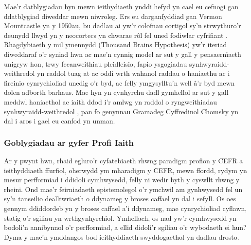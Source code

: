 Mae'r datblygiadau hyn mewn ieithydiaeth ynddi hefyd yn cael eu cefnogi gan ddatblygiad diweddar mewn niwroleg. Ers eu darganfyddiad gan Vermon Mountcastle yn y 1950au, bu dadlau ai yw'r colofnau cortigol sy'n strwythuro'r deunydd llwyd yn y neocortecs yn chwarae rôl fel uned fodiwlar cyfrifiant \parencite{horton_cortical_2005}. Rhagdybiaeth y mil ymennydd (Thousand Brains Hypothesis) \parencite{hawkins_theory_2017, hawkins_thousand_2021} yw'r iteriad diweddaraf o'r syniad hwn ac mae'n cynnig model ar sut y gall y pensaernïaeth unigryw hon, trwy fecanweithiau pleidleisio, fapio ysgogiadau synhwyraidd-weithredol yn raddol tuag at ac oddi wrth wahanol raddau o haniaethu ac i fireinio cynrychioliad unedig o'r byd, ac felly ymgysylltu'n well â'r byd mewn dolen adborth barhaus. Mae hyn yn cynhyrchu dadl gymhellol ar sut y gall meddwl haniaethol ac iaith ddod i'r amlwg yn raddol o ryngweithiadau synhwyraidd-weithredol \parencite{constantinescu_organizing_2016}, pan fo genynnau Gramadeg Cyffredinol Chomsky yn dal i aros i gael eu canfod yn unman.

\subsubsection{Goblygiadau ar gyfer Profi Iaith}
Ar y pwynt hwn, rhaid egluro'r cyfatebiaeth rhwng paradigm profion y CEFR a ieithyddiaeth ffurfiol, oherwydd ym mharadigm y CEFR, mewn ffordd, rydym yn mesur perfformiad i ddidoli cymhwysedd, felly ni wedir byth y cyswllt rhwng y rheini. Ond mae'r feirniadaeth epistemolegol o'r ymchwil am gynhwysedd fel un sy'n tanseilio dealltwriaeth o ddynameg y broses caffael yn dal i sefyll. Os oes gennym ddiddordeb yn y broses caffael a'i ddynameg, mae cynrychioliad cyflawn, statig o'r sgiliau yn wrthgynhyrchiol. Ymhellach, os nad yw'r cymhwysedd yn bodoli'n annibynnol o'r perfformiad, a ellid didoli'r sgiliau o'r wybodaeth ei hun? Dyma y mae'n ymddangos bod ieithyddiaeth swyddogaethol yn dadlau drosto.

